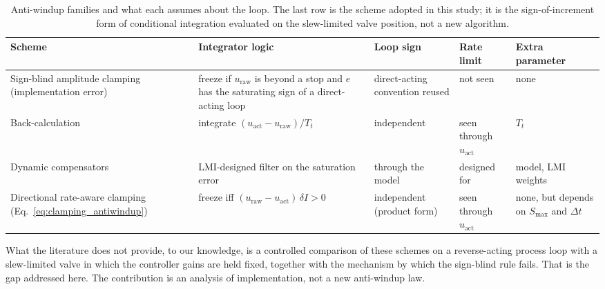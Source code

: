 \begin{table}[t]
\centering
\caption{Anti-windup families and what each assumes about the loop. The last row is the scheme adopted in this study; it is the sign-of-increment form of conditional integration \cite{peng1996nonlinear, hippe2006windup} evaluated on the slew-limited valve position, not a new algorithm.}\label{tab:aw_families}
\footnotesize
\begin{tabular}{p{3.6cm}p{4.2cm}p{2.6cm}p{2.2cm}p{2.5cm}}
\toprule
Scheme & Integrator logic & Loop sign & Rate limit & Extra parameter \\
\midrule
Sign-blind amplitude clamping (implementation error) & freeze if $u_{\text{raw}}$ is beyond a stop and $e$ has the saturating sign of a direct-acting loop & direct-acting convention reused & not seen & none \\
Back-calculation \cite{astrom1989windup, hippe2006windup} & integrate $(u_{\text{act}} - u_{\text{raw}})/T_t$ & independent & seen through $u_{\text{act}}$ & $T_t$ \\
Dynamic compensators \cite{galeani2009tutorial, tarbouriech2009antiwindup, lerch2021antiwindup} & LMI-designed filter on the saturation error & through the model & designed for & model, LMI weights \\
Directional rate-aware clamping (Eq.~\eqref{eq:clamping_antiwindup}) & freeze iff $(u_{\text{raw}}-u_{\text{act}})\,\delta I > 0$ & independent (product form) & seen through $u_{\text{act}}$ & none, but depends on $S_{\max}$ and $\Delta t$ \\
\bottomrule
\end{tabular}
\end{table}

What the literature does not provide, to our knowledge, is a controlled comparison of these schemes on a reverse-acting process loop with a slew-limited valve in which the controller gains are held fixed, together with the mechanism by which the sign-blind rule fails. That is the gap addressed here. The contribution is an analysis of implementation, not a new anti-windup law.

